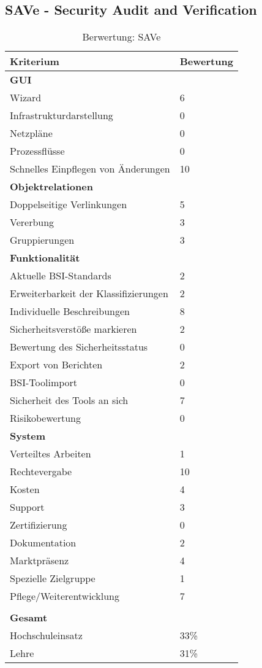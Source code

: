 \subsection{SAVe - Security Audit and Verification}
\begin{table}[h!tb]
	\begin{tabular}{|p{}|p{}|}
		\hline 
		Kriterium & Bewertung\\ 
		\hline 
		\textbf{GUI}& \\
		\hline
		Wizard & 6\\
		\hline 
		Infrastrukturdarstellung & 0 \\
		\hline 
		Netzpläne & 0 \\
		\hline 
		Prozessflüsse & 0 \\
		\hline 
		Schnelles Einpflegen von Änderungen & 10 \\
		\hline
		\textbf{Objektrelationen} & \\
		\hline 
		Doppelseitige Verlinkungen & 5 \\
		\hline 
		Vererbung & 3 \\
		\hline 
		Gruppierungen & 3 \\
		\hline 
		\textbf{Funktionalität} &\\
		\hline 
		Aktuelle BSI-Standards & 2 \\
		\hline  
		Erweiterbarkeit der Klassifizierungen & 2 \\
		\hline 
		Individuelle Beschreibungen & 8 \\
		\hline 
		Sicherheitsverstöße markieren & 2 \\
		\hline
		Bewertung des Sicherheitsstatus & 0 \\
		\hline
		Export von Berichten & 2 \\
		\hline
		BSI-Toolimport & 0 \\
		\hline
		Sicherheit des Tools an sich & 7 \\
		\hline
		Risikobewertung & 0 \\
		\hline
		\textbf{System}&  \\
		\hline
		Verteiltes Arbeiten & 1 \\
		\hline
		Rechtevergabe & 10 \\
		\hline
		Kosten & 4 \\
		\hline
		Support & 3 \\
		\hline
		Zertifizierung & 0 \\
		\hline
		Dokumentation & 2 \\
		\hline
		Marktpräsenz & 4 \\
		\hline
		Spezielle Zielgruppe & 1 \\
		\hline
		Pflege/Weiterentwicklung & 7 \\
		\hline
		\multicolumn{2}{c}{}\\
		\hline
		\textbf{Gesamt} & \\
		\hline
		Hochschuleinsatz & 33\%\\
		\hline
		Lehre & 31\%\\
		\hline
	\end{tabular} 
	\caption{Berwertung: SAVe}
	\label{tab:BerwertungSave}
\end{table}